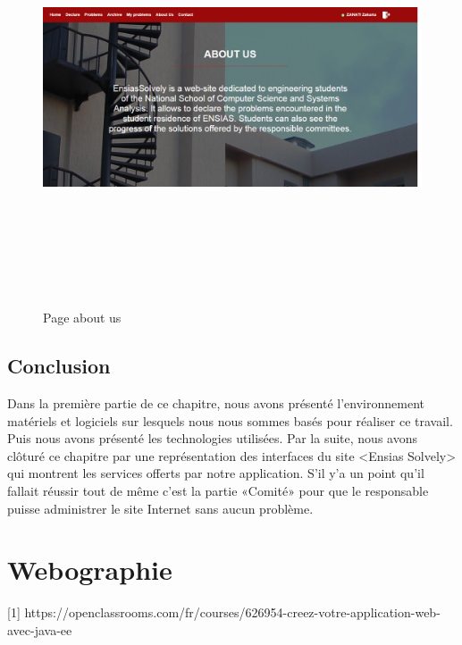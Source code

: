 \documentclass[11.5pt]{report}
\begin{document}
\newpage
\begin{figure}[h]
	
	\begin{center}
		\includegraphics[width=500pt,height=350pt]{aboutus.png} 
		\caption{Page about us}
	\end{center}
	
\end{figure}
\newpage

\section{Conclusion}
Dans la première partie de ce chapitre, nous avons présenté l’environnement matériels et logiciels sur lesquels nous nous sommes basés pour réaliser ce travail. Puis nous avons  présenté les technologies utilisées. Par la suite, nous avons clôturé ce chapitre par une représentation des interfaces du site <Ensias Solvely> qui montrent les services offerts par notre application. S’il y’a un point qu’il fallait réussir tout de même c’est la partie «Comité» pour que le responsable puisse administrer le site Internet sans aucun problème.
\chapter*{Webographie}
[1]   https://openclassrooms.com/fr/courses/626954-creez-votre-application-web-avec-java-ee\\
\end{document}
